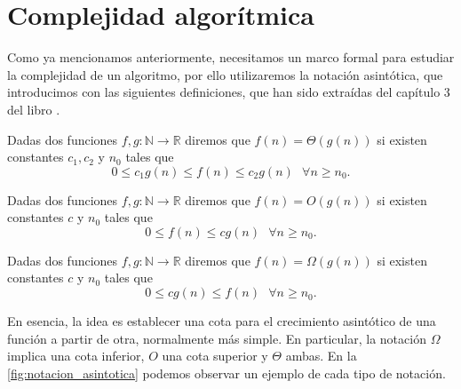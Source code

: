 
\chapter{Complejidad algorítmica}\label{ch:cuarto-capitulo}

Como ya mencionamos anteriormente, necesitamos un marco formal para estudiar la complejidad de un algoritmo, por ello utilizaremos la notación asintótica, que introducimos con las siguientes definiciones, que han sido extraídas del capítulo 3 del libro \cite{algorithms}. 

\begin{definicion}
	Dadas dos funciones $f,g:\mathbb{N}\rightarrow \mathbb{R}$ diremos que $f(n)=\Theta(g(n))$ si existen constantes $c_1,c_2$ y $n_0$ tales que $$0\leq c_1g(n)\leq f(n)\leq c_2g(n)\ \ \ \forall n\geq n_0.$$
\end{definicion}

\begin{definicion}
	Dadas dos funciones $f,g:\mathbb{N}\rightarrow \mathbb{R}$ diremos que $f(n)=O(g(n))$ si existen constantes $c$ y $n_0$ tales que $$0\leq f(n)\leq cg(n)\ \ \ \forall n\geq n_0.$$
\end{definicion}

\begin{definicion}
	Dadas dos funciones $f,g:\mathbb{N}\rightarrow \mathbb{R}$ diremos que $f(n)=\Omega(g(n))$ si existen constantes $c$ y $n_0$ tales que $$0\leq cg(n)\leq f(n)\ \ \ \forall n\geq n_0.$$
\end{definicion}

En esencia, la idea es establecer una cota para el crecimiento asintótico de una función a partir de otra, normalmente más simple. En particular, la notación $\Omega$ implica una cota inferior, $O$ una cota superior y $\Theta$ ambas. En la \autoref{fig:notacion_asintotica} podemos observar un ejemplo de cada tipo de notación. \\

